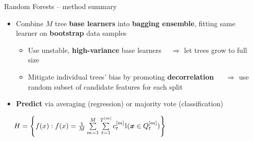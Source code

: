 \begin{frame}{Random Forests -- method summary}

 
  

\medskip

\begin{itemize}
  \item Combine $M$ tree \textbf{base learners} into 
  \textbf{bagging ensemble}, fitting same learner on \textbf{bootstrap} data
  samples
   \begin{itemize}
    \item Use unstable, \textbf{high-variance} base learners ~~$\Rightarrow$
    let trees grow to full size
    \item Mitigate individual trees' bias by promoting \textbf{decorrelation} 
    ~~ $\Rightarrow$ use random subset of 
    candidate features for each split
  \end{itemize}
  \item \textbf{Predict} via averaging (regression) or majority vote 
  (classification)
\end{itemize}

\medskip

 ~~
$H = \left\{ f(x): f(x) = \frac{1}{M} \sum\limits_{m = 1}^M 
\sum\limits_{t = 1}^{T^{[m]}} 
c_t^{[m]} \mathbb{I}(\bm{x} \in Q_t^{[m]}) \right\}$

\medskip


\end{frame}
